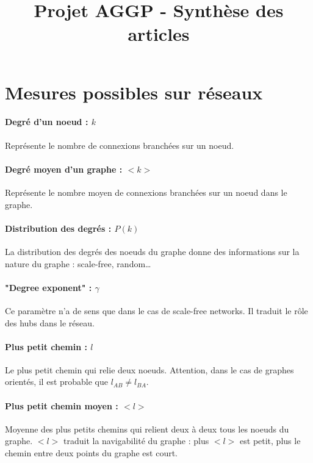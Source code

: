 

\title{Projet AGGP - Synthèse des articles}


\maketitle 

\section{Mesures possibles sur réseaux}

\paragraph*{Degré d'un noeud : $k$\\}
Représente le nombre de connexions branchées sur un noeud. 

\paragraph*{Degré moyen d'un graphe : $<k>$\\}
Représente le nombre moyen de connexions branchées sur un noeud dans le graphe. 

\paragraph*{Distribution des degrés : $P(k)$\\}
La distribution des degrés des noeuds du graphe donne des informations sur la nature du graphe : scale-free, random\ldots

\paragraph*{"Degree exponent" : $\gamma$\\}
Ce paramètre n'a de sens que dans le cas de scale-free networks. Il traduit le rôle des hubs dans le réseau.

\paragraph*{Plus petit chemin : $l$\\} 
Le plus petit chemin qui relie deux noeuds. Attention, dans le cas de graphes orientés, il est probable que $l_{AB} \neq l_{BA}$.

\paragraph*{Plus petit chemin moyen : $<l>$\\}
Moyenne des plus petits chemins qui relient deux à deux tous les noeuds du graphe. $<l>$ traduit la navigabilité du graphe : plus $<l>$ est petit, plus le chemin entre deux points du graphe est court. 

